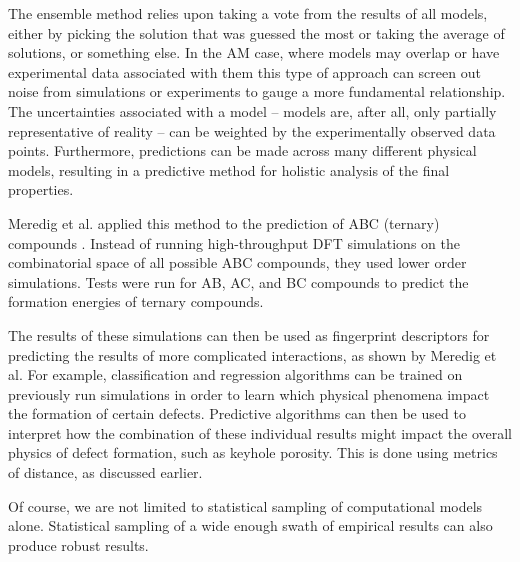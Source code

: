 The ensemble method relies upon taking a vote from the results of all models, either by picking the solution that was guessed the most or taking the average of solutions, or something else. In the AM case, where models may overlap or have experimental data associated with them this type of approach can screen out noise from simulations or experiments to gauge a more fundamental relationship. The uncertainties associated with a model -- models are, after all, only partially representative of reality -- can be weighted by the experimentally observed data points. Furthermore, predictions can be made across many different physical models, resulting in a predictive method for holistic analysis of the final properties.

Meredig et al. applied this method to the prediction of ABC (ternary) compounds \cite{Meredig2014}. Instead of running high-throughput DFT simulations on the combinatorial space of all possible ABC compounds, they used lower order simulations. Tests were run for AB, AC, and BC compounds to predict the formation energies of ternary compounds.

The results of these simulations can then be used as fingerprint descriptors for predicting the results of more complicated interactions, as shown by Meredig et al. For example, classification and regression algorithms can be trained on previously run simulations in order to learn which physical phenomena impact the formation of certain defects. Predictive algorithms can then be used to interpret how the combination of these individual results might impact the overall physics of defect formation, such as keyhole porosity. This is done using metrics of distance, as discussed earlier. 

Of course, we are not limited to statistical sampling of computational models alone. Statistical sampling of a wide enough swath of empirical results can also produce robust results. 